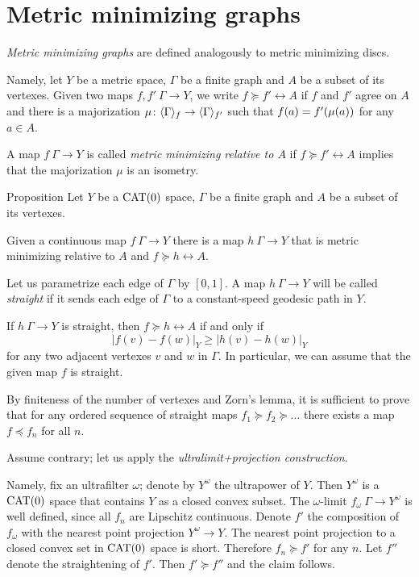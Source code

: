 \section{Metric minimizing graphs}\label{Metric minimizing graphs}

\emph{Metric minimizing graphs} are defined analogously to metric minimizing discs.

Namely, let $Y$ be a metric space, $\Gamma$ be a finite graph and $A$ be a subset of its vertexes.
Given two maps $f,f'\:\Gamma\to Y$, we write $f\succcurlyeq f'\rel A$ if $f$ and $f'$ agree on $A$ 
and there is a majorization $\mu\colon\langle\Gamma\rangle_f\to \langle\Gamma\rangle_{f'}$
such that $f(a)\zz=f'(\mu(a))$ for any $a\in A$.

A map $f\:\Gamma\to Y$ is called \emph{metric minimizing relative to $A$} if $f\succcurlyeq f'\rel A$ implies that the majorization $\mu$ is an isometry.

\begin{thm}{Proposition}\label{prop:metric-min-graph-exist}
Let $Y$ be a $\mathop{\rm CAT}\nolimits(0)$ space, 
$\Gamma$ be a finite graph and $A$ be a subset of its vertexes.

Given a continuous map $f\:\Gamma\to Y$ there is a map $h\:\Gamma\to Y$ 
that is metric minimizing relative to $A$ and $f\succcurlyeq h\rel A$.
\end{thm}

Let us parametrize each edge of $\Gamma$ by $[0,1]$.
A map $h\:\Gamma\to Y$ will be called \emph{straight} if it
sends each edge of $\Gamma$ to a constant-speed geodesic path in $Y$.

If $h\:\Gamma\to Y$ is straight, then $f\succcurlyeq h\rel A$ if and only if 
\[|f(v)-f(w)|_Y\ge |h(v)-h(w)|_Y\]
for any two adjacent vertexes $v$ and $w$ in $\Gamma$.
In particular, we can assume that the given map $f$ is straight.

By finiteness of the number of vertexes and Zorn's lemma,
it is sufficient to prove that for any ordered sequence of straight maps $f_1\succcurlyeq f_2\succcurlyeq \dots$ there exists a map $f\preccurlyeq f_n$ for all $n$.

Assume contrary; let us apply the \emph{ultralimit+projection construction}.

Namely, fix an ultrafilter $\omega$; denote by $Y^\omega$ the ultrapower of $Y$. 
Then $Y^\omega$
is a $\mathop{\rm CAT}\nolimits(0)$ space that contains $Y$ as a closed convex subset. 
The $\omega$-limit $f_\omega\:\Gamma\to Y^\omega$ is well defined, since all $f_n$ are Lipschitz continuous. 
Denote $f'$ the composition of $f_\omega$ with the nearest point projection $Y^\omega\to Y$.
The nearest point projection to a closed convex set in $\mathop{\rm CAT}\nolimits(0)$ space is short.
Therefore $f_n\succcurlyeq f'$ for any $n$.
Let $f''$ denote the straightening of $f'$.
Then $f'\succcurlyeq f''$ and the claim follows.
\qeds


